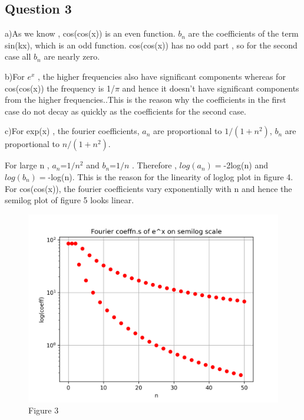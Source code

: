 \documentclass[11pt, a4paper]{article}
\begin{document}
\subsection*{Question 3}

a)As we know , cos(cos(x)) is an even function. $b_n$ are the coefficients of the term sin(kx), which is an odd function. cos(cos(x)) has no odd part , so for the second case all $b_n$ are nearly zero.

b)For $e^x$ , the higher frequencies also have significant components whereas for cos(cos(x)) the frequency is 1/$\pi$ and hence it doesn't have significant components from the higher frequencies..This is the reason why the coefficients in the first case do not decay as quickly as the coefficients for the second case.

c)For exp(x) , the fourier coefficients,
$a_n$ are proportional to $1/(1+n^2)$,
$b_n$ are proportional to $n/(1+n^2)$.

For large n , $a_n$=$1/n^2$ and $b_n$=$1/n$ .
Therefore , $log(a_n)=$-2log(n) and $log(b_n)=$-log(n).
This is the reason for the linearity of loglog plot in figure 4.
For cos(cos(x)),
the fourier coefficients vary exponentially with n and hence the semilog plot of figure 5 looks linear.

\begin{figure}[!tbh]
\centering
\includegraphics[scale=0.6]{assn4_plot3.png}
\caption{Figure 3}
\label{fig:plot3}
\end{figure} 
\end{document}
